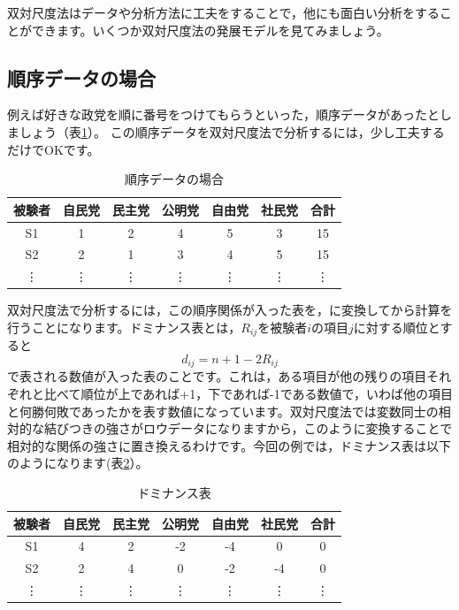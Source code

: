 \documentclass{ltjsbook}
\begin{document}
双対尺度法はデータや分析方法に工夫をすることで，他にも面白い分析をすることができます。いくつか双対尺度法の発展モデルを見てみましょう。
\subsection{順序データの場合}
例えば好きな政党を順に番号をつけてもらうといった，順序データがあったとしましょう（表\ref{jun}）。
この順序データを双対尺度法で分析するには，少し工夫するだけでOKです。
\begin{table}[ht]
    \begin{center}
        \caption{順序データの場合}
        \begin{tabular}{c|ccccc|c}
            被験者    & 自民党    & 民主党    & 公明党    & 自由党    & 社民党    & 合計     \\
            \hline
            S1     & 1      & 2      & 4      & 5      & 3      & 15     \\
            S2     & 2      & 1      & 3      & 4      & 5      & 15     \\
            \vdots & \vdots & \vdots & \vdots & \vdots & \vdots & \vdots \\
        \end{tabular}
        \label{jun}
    \end{center}
\end{table}

双対尺度法で分析するには，この順序関係が入った表を，に変換してから計算を行うことになります。ドミナンス表とは，$R_{ij}$を被験者$i$の項目$j$に対する順位とすると
\begin{equation}
    d_{ij}=n+1-2R_{ij}
\end{equation}
で表される数値が入った表のことです。これは，ある項目が他の残りの項目それぞれと比べて順位が上であれば+1，下であれば-1である数値で，いわば他の項目と何勝何敗であったかを表す数値になっています。双対尺度法では変数同士の相対的な結びつきの強さがロウデータになりますから，このように変換することで相対的な関係の強さに置き換えるわけです。今回の例では，ドミナンス表は以下のようになります(表\ref{dominance}）。
\begin{table}[ht]
    \begin{center}
        \caption{ドミナンス表}
        \begin{tabular}{c|ccccc|c}
            被験者    & 自民党    & 民主党    & 公明党    & 自由党    & 社民党    & 合計     \\
            \hline
            S1     & 4      & 2      & -2     & -4     & 0      & 0      \\
            S2     & 2      & 4      & 0      & -2     & -4     & 0      \\
            \vdots & \vdots & \vdots & \vdots & \vdots & \vdots & \vdots \\
        \end{tabular}
        \label{dominance}
    \end{center}
\end{table}
\end{document}
